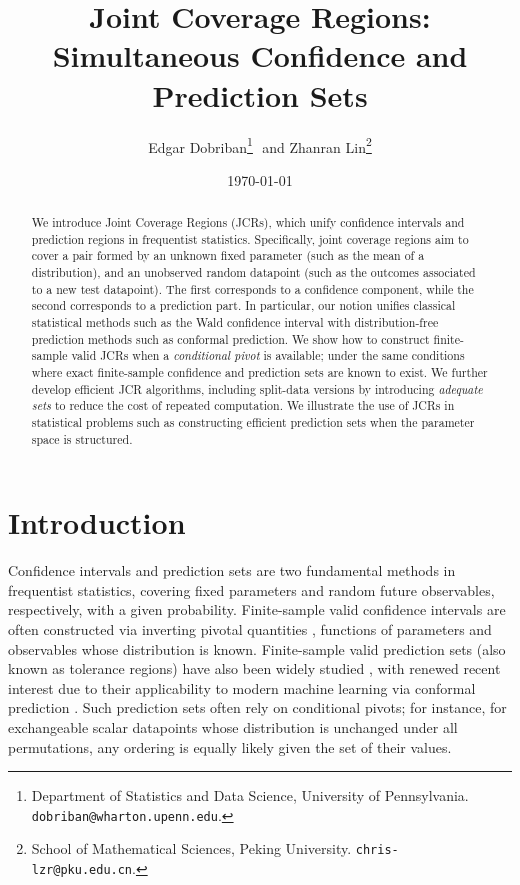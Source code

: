 \documentclass[english]{article}
\title{Joint Coverage Regions:\\
Simultaneous Confidence and Prediction Sets}
\author
{Edgar Dobriban\footnote{
Department of Statistics and Data Science, University of Pennsylvania.		\texttt{dobriban@wharton.upenn.edu}.}\,\,
and
Zhanran Lin\footnote{School of Mathematical Sciences, Peking University. \texttt{chris-lzr@pku.edu.cn}.}}
\date{\today}
\begin{document}
\maketitle

\begin{abstract}
\sloppy

We introduce Joint Coverage Regions (JCRs), which unify confidence intervals and prediction regions in frequentist statistics.
Specifically, joint coverage regions aim to cover a pair formed by an unknown fixed parameter (such as the mean of a distribution), and an unobserved random datapoint (such as the outcomes associated to a new test datapoint). 
The first corresponds to a confidence component, while the second corresponds to a prediction part.
In particular, our notion unifies classical statistical methods such as the Wald confidence interval with distribution-free prediction methods such as conformal prediction.
We show how to construct finite-sample valid JCRs when a \emph{conditional pivot} is available; 
under the same conditions 
where exact finite-sample confidence and prediction sets are known to exist.
We further develop efficient JCR algorithms, including split-data versions by introducing \emph{adequate sets} to reduce the cost of repeated computation.
We illustrate the use of JCRs in statistical problems such as constructing efficient prediction sets when the parameter space is structured.
\end{abstract}
\fussy

\setcounter{tocdepth}{2}
\tableofcontents

\section{Introduction}\label{sec:introduction}

Confidence intervals and prediction sets are two fundamental methods in frequentist statistics, 
covering fixed parameters and random future observables, respectively, with a given probability. 
Finite-sample valid confidence intervals are often  constructed via inverting pivotal quantities \citep[e.g.,][etc]{cox1979theoretical, lehmann1998theory}, functions of parameters and observables whose distribution is known.
Finite-sample valid prediction sets (also known as tolerance regions) have also been widely studied \citep[e.g.,][etc]{wilks1941determination,Wald1943, guttman1970statistical}, 
with renewed recent interest due to their applicability to modern machine learning via conformal prediction \citep{vovk2022algorithmic,lei2013distribution}.
Such prediction sets often rely on conditional pivots; for instance, for exchangeable scalar datapoints whose distribution is unchanged under all permutations, 
any ordering is equally likely given the set of their values.
\end{document}

